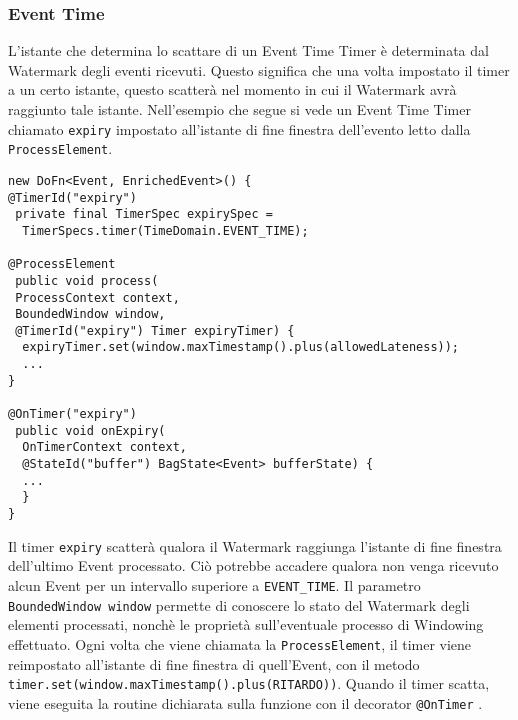 \subsubsection{Event Time}
L'istante che determina lo scattare di un Event Time Timer è determinata dal Watermark degli eventi ricevuti. Questo significa che una volta impostato il timer a un certo istante, questo scatterà nel momento in cui il Watermark avrà raggiunto tale istante. Nell'esempio che segue si vede un Event Time Timer chiamato \texttt{expiry} impostato all'istante di fine finestra dell'evento letto dalla \texttt{ProcessElement}.
\lstset{language=Java}
\begin{lstlisting}
new DoFn<Event, EnrichedEvent>() {
@TimerId("expiry")
 private final TimerSpec expirySpec =
  TimerSpecs.timer(TimeDomain.EVENT_TIME);

@ProcessElement
 public void process(
 ProcessContext context,
 BoundedWindow window,
 @TimerId("expiry") Timer expiryTimer) {
  expiryTimer.set(window.maxTimestamp().plus(allowedLateness));
  ...
}

@OnTimer("expiry")
 public void onExpiry(
  OnTimerContext context,
  @StateId("buffer") BagState<Event> bufferState) {
  ...
  }
}
\end{lstlisting}
Il timer \texttt{expiry} scatterà qualora il Watermark raggiunga l'istante di fine finestra dell'ultimo Event processato. Ciò potrebbe accadere qualora non venga ricevuto alcun Event per un intervallo superiore a \texttt{EVENT\_TIME}. Il parametro \texttt{BoundedWindow window} permette di conoscere lo stato del Watermark degli elementi processati, nonchè le proprietà sull'eventuale processo di Windowing effettuato. Ogni volta che viene chiamata la \texttt{ProcessElement}, il timer viene reimpostato all'istante di fine finestra di quell'Event, con il metodo \texttt{timer.set(window.maxTimestamp().plus(RITARDO))}. Quando il timer scatta, viene eseguita la routine dichiarata sulla funzione con il decorator \texttt{@OnTimer} .
